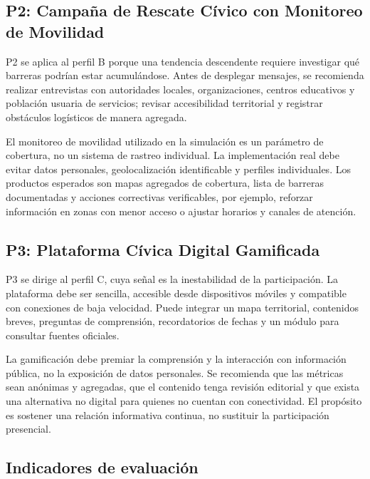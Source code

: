 \documentclass[11pt,a4paper]{article}
\begin{document}
\subsection{P2: Campaña de Rescate Cívico con Monitoreo de Movilidad}

P2 se aplica al perfil B porque una tendencia descendente requiere investigar qué barreras podrían estar acumulándose. Antes de desplegar mensajes, se recomienda realizar entrevistas con autoridades locales, organizaciones, centros educativos y población usuaria de servicios; revisar accesibilidad territorial y registrar obstáculos logísticos de manera agregada.

El monitoreo de movilidad utilizado en la simulación es un parámetro de cobertura, no un sistema de rastreo individual. La implementación real debe evitar datos personales, geolocalización identificable y perfiles individuales. Los productos esperados son mapas agregados de cobertura, lista de barreras documentadas y acciones correctivas verificables, por ejemplo, reforzar información en zonas con menor acceso o ajustar horarios y canales de atención.

\subsection{P3: Plataforma Cívica Digital Gamificada}

P3 se dirige al perfil C, cuya señal es la inestabilidad de la participación. La plataforma debe ser sencilla, accesible desde dispositivos móviles y compatible con conexiones de baja velocidad. Puede integrar un mapa territorial, contenidos breves, preguntas de comprensión, recordatorios de fechas y un módulo para consultar fuentes oficiales.

La gamificación debe premiar la comprensión y la interacción con información pública, no la exposición de datos personales. Se recomienda que las métricas sean anónimas y agregadas, que el contenido tenga revisión editorial y que exista una alternativa no digital para quienes no cuentan con conectividad. El propósito es sostener una relación informativa continua, no sustituir la participación presencial.

\subsection{Indicadores de evaluación}
\end{document}
